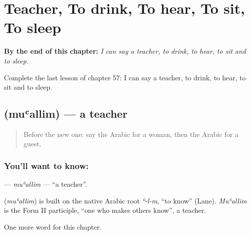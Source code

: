 
\chapter{Teacher, To drink, To hear, To sit, To sleep}
\label{ch:ar-teacher-to-drink-to-hear-to-sit-to-sleep}

\begin{chapteropening}
\textbf{By the end of this chapter:} \emph{I can say a teacher, to drink, to hear, to sit and to sleep.}

Complete the last lesson of chapter 57: I can say a teacher, to drink, to hear, to sit and to sleep.
\end{chapteropening}

\section[\texorpdfstring{\ar{معلم} (muʿallim)}{معلم (muʿallim)}]{ (muʿallim) — a teacher}

\label{lesson:AR-C57-muallim}



\begin{quote}
Before the new one: say the Arabic for a woman, then the Arabic for a guest.
\end{quote}

\subsection*{You'll want to know: }
\textbf{} — \emph{muʿallim} — \textquotedblleft{}a teacher\textquotedblright{}.

\begin{cousinweb}
\textbf{} (\emph{muʿallim}) is built on the native Arabic root \emph{ʿ-l-m}, \textquotedblleft{}to know\textquotedblright{} (Lane). \emph{Muʿallim} is the Form II participle, \textquotedblleft{}one who makes others know\textquotedblright{}, a teacher.
\end{cousinweb}

\begin{grammarlens}[title={What you've built}]
One more word for this chapter.
\end{grammarlens}

